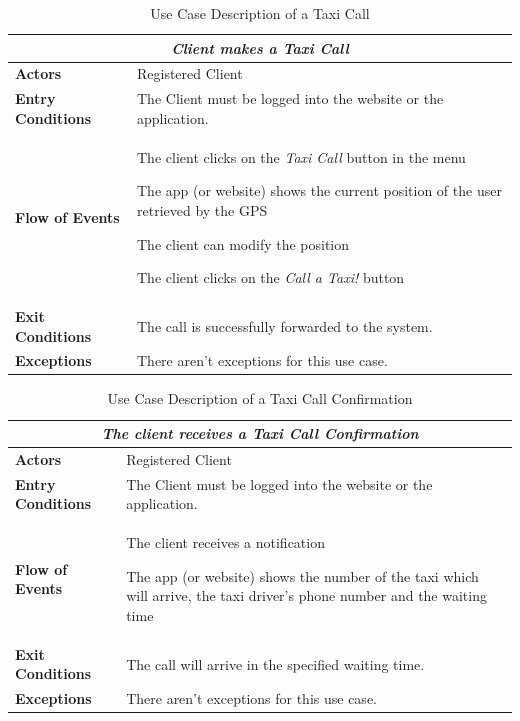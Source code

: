 \documentclass[a4paper]{article}
\begin{document}
\begin{table} [H]
\begin{center}
\begin{tabular}{ |m{}|m{}|  }
\hline
    \multicolumn{2}{|c|}{\textbf{\textit{Client makes a Taxi Call}}} \\
\hline \hline
    \textbf{Actors}
&   Registered Client
\\ \hline
    \textbf{Entry Conditions}
&   The Client must be logged into the website or the application.
\\ \hline
    \textbf{Flow of Events}
& 
    \begin{enumerate*}
    \item The client clicks on the \emph{Taxi Call} button in the menu
    \item The app (or website) shows the current position of the user retrieved by the GPS
    \item The client can modify the position
    \item The client clicks on the \emph{Call a Taxi!} button
    \end{enumerate*}
\\ \hline
    \textbf{Exit Conditions}
&   The call is successfully forwarded to the system.
\\ \hline
    \textbf{Exceptions}
&   
    There aren't exceptions for this use case.
\\ \hline
\end{tabular}
\end{center}
\caption{Use Case Description of a Taxi Call}
\label{table:clientcall}
\end{table}

\begin{table} [H]
\begin{center}
\begin{tabular}{ |m{}|m{}|  }
\hline
    \multicolumn{2}{|c|}{\textbf{\textit{The client receives a Taxi Call Confirmation}}} \\
\hline \hline
    \textbf{Actors}
&   Registered Client
\\ \hline
    \textbf{Entry Conditions}
&   The Client must be logged into the website or the application.
\\ \hline
    \textbf{Flow of Events}
& 
    \begin{enumerate*}
    \item The client receives a notification
    \item The app (or website) shows the number of the taxi which will arrive, the taxi driver's phone number and the waiting time
    \end{enumerate*}
\\ \hline
    \textbf{Exit Conditions}
&   The call will arrive in the specified waiting time.
\\ \hline
    \textbf{Exceptions}
&   
    There aren't exceptions for this use case.
\\ \hline
\end{tabular}
\end{center}
\caption{Use Case Description of a Taxi Call Confirmation}
\label{table:clientconfirmation}
\end{table}
\end{document}
